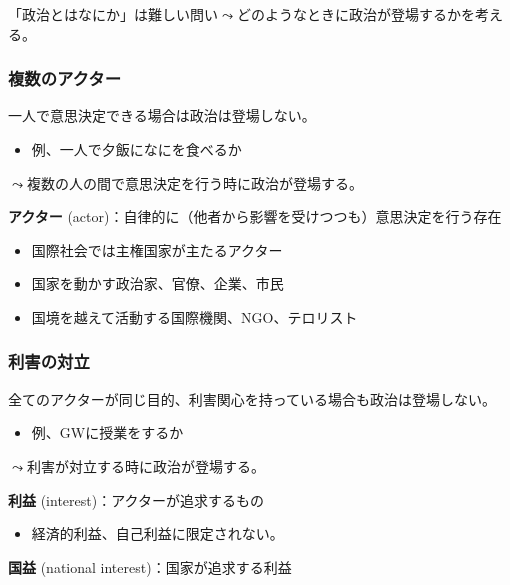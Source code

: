 \documentclass[
  xelatex,
  ja=standard]{bxjsarticle}
\providecommand{\tightlist}{%
  \setlength{\itemsep}{0pt}\setlength{\parskip}{0pt}}\usepackage{longtable,booktabs,array}
\begin{document}
「政治とはなにか」は難しい問い\(\leadsto\)どのようなときに政治が登場するかを考える。

\hypertarget{ux8907ux6570ux306eux30a2ux30afux30bfux30fc}{%
\subsubsection{複数のアクター}\label{ux8907ux6570ux306eux30a2ux30afux30bfux30fc}}

一人で意思決定できる場合は政治は登場しない。

\begin{itemize}
\tightlist
\item
  例、一人で夕飯になにを食べるか
\end{itemize}

\(\leadsto\)複数の人の間で意思決定を行う時に政治が登場する。

\textbf{アクター}
(actor)：自律的に（他者から影響を受けつつも）意思決定を行う存在

\begin{itemize}
\tightlist
\item
  国際社会では主権国家が主たるアクター
\item
  国家を動かす政治家、官僚、企業、市民
\item
  国境を越えて活動する国際機関、NGO、テロリスト
\end{itemize}

\hypertarget{ux5229ux5bb3ux306eux5bfeux7acb}{%
\subsubsection{利害の対立}\label{ux5229ux5bb3ux306eux5bfeux7acb}}

全てのアクターが同じ目的、利害関心を持っている場合も政治は登場しない。

\begin{itemize}
\tightlist
\item
  例、GWに授業をするか
\end{itemize}

\(\leadsto\)利害が対立する時に政治が登場する。

\textbf{利益} (interest)：アクターが追求するもの

\begin{itemize}
\tightlist
\item
  経済的利益、自己利益に限定されない。
\end{itemize}

\textbf{国益} (national interest)：国家が追求する利益
\end{document}
